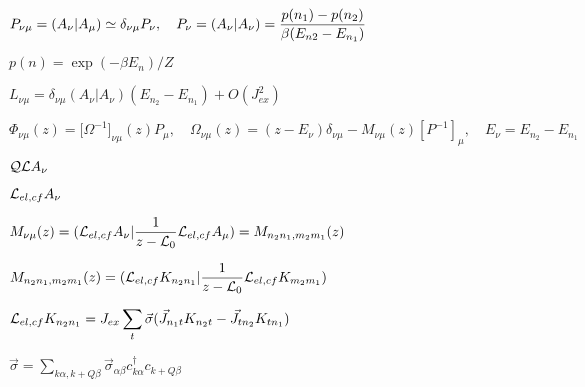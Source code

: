 \documentclass[twoside]{article}
\def\lthtmlcheckvsize{\ifdim\ht\sizebox<\vsize 
  \ifdim\wd\sizebox<\hsize\expandafter\hfill\fi \expandafter\vfill
  \else\expandafter\vss\fi}%
\begin{document}
{\newpage\clearpage
{}%
$\displaystyle P_{\nu\mu}=(A_\nu\vert A_\mu)\simeq\delta_{\nu
\mu}P_\nu, \quad P_\nu=(A_\nu\vert
A_\nu)={p(n_1)-p(n_2)\over \beta (E_{n2}-E_{n_1})}
$%
\lthtmlindisplaymathZ
\lthtmlcheckvsize\clearpage}

{\newpage\clearpage
{}%
$p(n)=\exp(-\beta E_n)/Z$%
\lthtmlindisplaymathZ
\lthtmlcheckvsize\clearpage}

{\newpage\clearpage
{}%
$\displaystyle L_{\nu\mu}=\delta_{\nu\mu}(A_\nu\vert A_\nu) (E_{n_2}-E_{n_1} )
+O(J_{ex}^2)
$%
\lthtmlindisplaymathZ
\lthtmlcheckvsize\clearpage}

{\newpage\clearpage
{}%
$\displaystyle \Phi_{\nu\mu}(z)=\bigl[\Omega^{-1}\bigr]_{\nu\mu}(z)
P_\mu, \quad
\Omega_{\nu\mu}(z)=(z-E_\nu)\delta_{\nu\mu} -
M_{\nu\mu}(z)[P^{-1}]_\mu, \quad
E_\nu = E_{n_2}- E_{n_1}
$%
\lthtmlindisplaymathZ
\lthtmlcheckvsize\clearpage}

{\newpage\clearpage
{}%
${\cal QL}A_\nu$%
\lthtmlindisplaymathZ
\lthtmlcheckvsize\clearpage}

{\newpage\clearpage
{}%
${\cal L}_{el,cf}A_\nu$%
\lthtmlindisplaymathZ
\lthtmlcheckvsize\clearpage}

{\newpage\clearpage
{}%
$\displaystyle M_{\nu \mu}(z)= ({\cal L}_{el,cf}A_\nu \vert{1\over z- {\cal
L}_0}{\cal L}_{el,cf}A_\mu)=
M_{n_2n_1,m_2m_1}(z)
$%
\lthtmlindisplaymathZ
\lthtmlcheckvsize\clearpage}

{\newpage\clearpage
{}%
$\displaystyle M_{n_2n_1,m_2m_1}(z)=({\cal L}_{el,cf} K_{n_2n_1}\vert{1\over z-{\cal
L}_0}{\cal L}_{el,cf} K_{m_2m_1})
$%
\lthtmlindisplaymathZ
\lthtmlcheckvsize\clearpage}

{\newpage\clearpage
{}%
$\displaystyle {\cal L}_{el,cf} K_{n_2n_1} = J_{ex}\sum_t \vec \sigma(\vec  J_{n_1t}
K_{n_2t} - \vec
J_{tn_2}K_{tn_1})
$%
\lthtmlindisplaymathZ
\lthtmlcheckvsize\clearpage}

{\newpage\clearpage
{}%
$\displaystyle \vec \sigma = \sum_{k\alpha, k+Q\beta}\vec \sigma_{\alpha\beta}
c^\dagger_{k\alpha}c_{k+Q\beta}
$%
\lthtmlindisplaymathZ
\lthtmlcheckvsize\clearpage}
\end{document}

